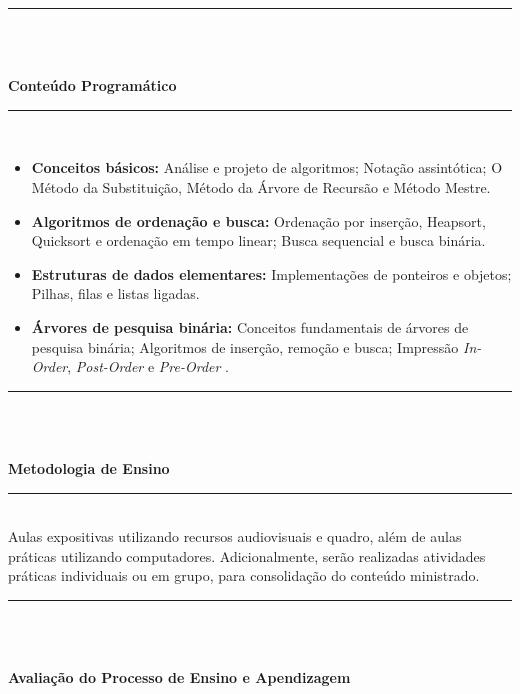 \noindent\rule{16.5cm}{0.4pt}\\
\\
\vspace{-12mm}
\begin{center}\textbf{Conteúdo Programático}\end{center}
\vspace{-5mm}
\noindent\rule{16.5cm}{0.4pt}
\\
\begin{itemize}
 \item \textbf{Conceitos básicos:} Análise e projeto de algoritmos; Notação assintótica; O Método da Substituição, Método da Árvore de Recursão e Método Mestre.
 \item \textbf{Algoritmos de ordenação e busca:} Ordenação por inserção, Heapsort, Quicksort e ordenação em tempo linear; Busca sequencial e busca binária.
 \item \textbf{Estruturas de dados elementares:} Implementações de ponteiros e objetos; Pilhas, filas e listas ligadas.
 \item \textbf{Árvores de pesquisa binária:} Conceitos fundamentais de árvores de pesquisa binária; Algoritmos de inserção, remoção e busca; Impressão \textit{In-Order}, \textit{Post-Order} e \textit{Pre-Order} .
\end{itemize}
\noindent\rule{16.5cm}{0.4pt}\\
\\
\vspace{-12mm}
\begin{center}\textbf{Metodologia de Ensino}\end{center} 
\vspace{-5mm}
\noindent\rule{16.5cm}{0.4pt}
\\
   Aulas expositivas utilizando recursos audiovisuais e quadro, além de aulas práticas utilizando computadores. Adicionalmente, serão realizadas atividades práticas individuais ou em grupo, para consolidação do conteúdo ministrado.\\
\noindent\rule{16.5cm}{0.4pt}\\
\\
\vspace{-12mm}
\begin{center}\textbf{Avaliação do Processo de Ensino e Apendizagem}\end{center}
\vspace{-5mm}
